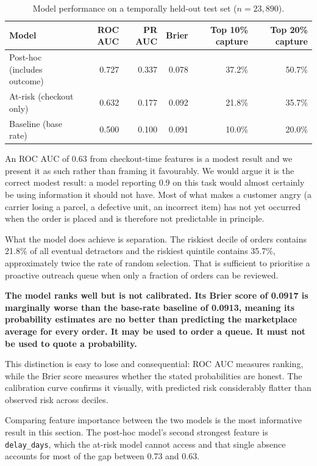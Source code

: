 \documentclass[11pt,a4paper]{article}
\newcommand{\finding}[1]{%
  \par\vspace{0.6em}%
  \noindent\begin{minipage}{\textwidth}%
  \setlength{\fboxsep}{9pt}%
  \noindent\colorbox{wash}{\begin{minipage}{\dimexpr\textwidth-2\fboxsep\relax}%
  \color{ink}\textbf{#1}%
  \end{minipage}}%
  \end{minipage}\par\vspace{0.6em}%
}
\begin{document}
\begin{table}[H]
\centering
\small
\caption{Model performance on a temporally held-out test set ($n = 23{,}890$).}
\label{tab:model}
\begin{tabular}{@{}lrrrrr@{}}
\toprule
\textbf{Model} & \textbf{ROC AUC} & \textbf{PR AUC} & \textbf{Brier} &
\textbf{Top 10\% capture} & \textbf{Top 20\% capture}\\
\midrule
Post-hoc (includes outcome) & 0.727 & 0.337 & 0.078 & 37.2\% & 50.7\%\\
At-risk (checkout only) & 0.632 & 0.177 & 0.092 & 21.8\% & 35.7\%\\
\midrule
Baseline (base rate) & 0.500 & 0.100 & 0.091 & 10.0\% & 20.0\%\\
\bottomrule
\end{tabular}
\end{table}

An ROC AUC of 0.63 from checkout-time features is a modest result and we present
it as such rather than framing it favourably. We would argue it is the correct
modest result: a model reporting 0.9 on this task would almost certainly be using
information it should not have. Most of what makes a customer angry (a carrier
losing a parcel, a defective unit, an incorrect item) has not yet occurred when
the order is placed and is therefore not predictable in principle.

What the model does achieve is separation. The riskiest decile of orders contains
21.8\% of all eventual detractors and the riskiest quintile contains 35.7\%,
approximately twice the rate of random selection. That is sufficient to prioritise a
proactive outreach queue when only a fraction of orders can be reviewed.

\finding{The model ranks well but is not calibrated. Its Brier score of 0.0917 is
marginally worse than the base-rate baseline of 0.0913, meaning its probability
estimates are no better than predicting the marketplace average for every order.
It may be used to order a queue. It must not be used to quote a probability.}

This distinction is easy to lose and consequential: ROC AUC measures ranking, while
the Brier score measures whether the stated probabilities are honest. The
calibration curve confirms it visually, with predicted risk considerably flatter
than observed risk across deciles.

Comparing feature importance between the two models is the most informative result
in this section. The post-hoc model's second strongest feature is
\texttt{delay\_days}, which the at-risk model cannot access and that single absence
accounts for most of the gap between 0.73 and 0.63.
\end{document}

